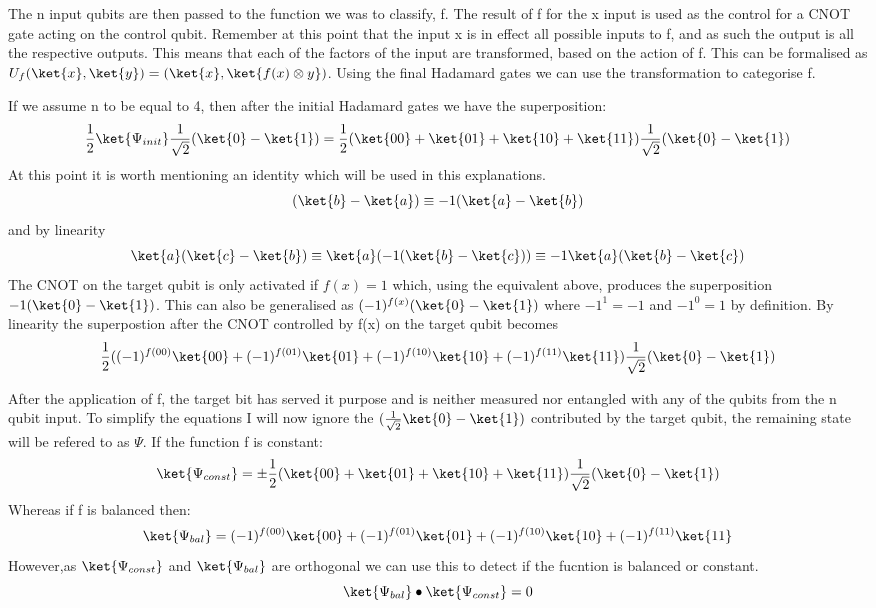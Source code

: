 \documentclass[authoryearcitations]{UoYCSproject}
\begin{document}
The n input qubits are then passed to the function we was to classify, f.
The result of f for the x input is used as the control for a CNOT gate acting on the control qubit.
Remember at this point that the input x is in effect all possible inputs to f, and as such the output is all the respective outputs.
This means that each of the factors of the input are transformed, based on the action of f.
This can be formalised as $U_f(\ket{x},\ket{y})=(\ket{x},\ket{f(x)\otimes{y}})$.
Using the final Hadamard gates we can use the transformation to categorise f.

If we assume n to be equal to 4, then after the initial Hadamard gates we have the superposition:
\begin{equation}
\frac{1}{2}\ket{\Psi_{init}}\frac{1}{\sqrt{2}}(\ket{0}-\ket{1})=\frac{1}{2}(\ket{00}+\ket{01}+\ket{10}+\ket{11})\frac{1}{\sqrt{2}}(\ket{0}-\ket{1})
\end{equation}
At this point it is worth mentioning an identity which will be used in this explanations.
\begin{equation}
(\ket{b}-\ket{a})\equiv-1(\ket{a}-\ket{b})
\end{equation}
and by linearity
\begin{equation}
\ket{a}(\ket{c}-\ket{b})\equiv\ket{a}(-1(\ket{b}-\ket{c}))\equiv-1\ket{a}(\ket{b}-\ket{c})
\label{target_qubit_identity}
\end{equation}
The CNOT on the target qubit is only activated if $f(x)=1$ which, using the equivalent above, produces the superposition $-1(\ket{0}-\ket{1})$.
This can also be generalised as $(-1)^{f(x)}(\ket{0}-\ket{1})$ where $-1^1=-1$ and $-1^0=1$ by definition.
By linearity the superpostion after the CNOT controlled by f(x) on the target qubit becomes
\begin{equation}
\frac{1}{2}((-1)^{f(00)}\ket{00}+(-1)^{f(01)}\ket{01}+(-1)^{f(10)}\ket{10}+(-1)^{f(11)}\ket{11})\frac{1}{\sqrt{2}}(\ket{0}-\ket{1})
\end{equation}

After the application of f, the target bit has served it purpose and is neither measured nor entangled with any of the qubits from the n qubit input.
To simplify the equations I will now ignore the $(\frac{1}{\sqrt{2}}\ket{0}-\ket{1})$ contributed by the target qubit, the remaining state will be refered to as $\Psi$.
If the function f is constant:
\begin{equation}
\ket{\Psi_{const}}=\pm\frac{1}{2}(\ket{00}+\ket{01}+\ket{10}+\ket{11})\frac{1}{\sqrt{2}}(\ket{0}-\ket{1})
\end{equation}
Whereas if f is balanced then:
\begin{equation}
\ket{\Psi_{bal}}=(-1)^{f(00)}\ket{00}+(-1)^{f(01)}\ket{01}+(-1)^{f(10)}\ket{10}+(-1)^{f(11)}\ket{11}
\end{equation}
However,as $\ket{\Psi_{const}}$ and $\ket{\Psi_{bal}}$ are orthogonal we can use this to detect if the fucntion is balanced or constant.
\begin{equation}
\ket{\Psi_{bal}}\bullet\ket{\Psi_{const}} = 0
\end{equation}
\end{document}
